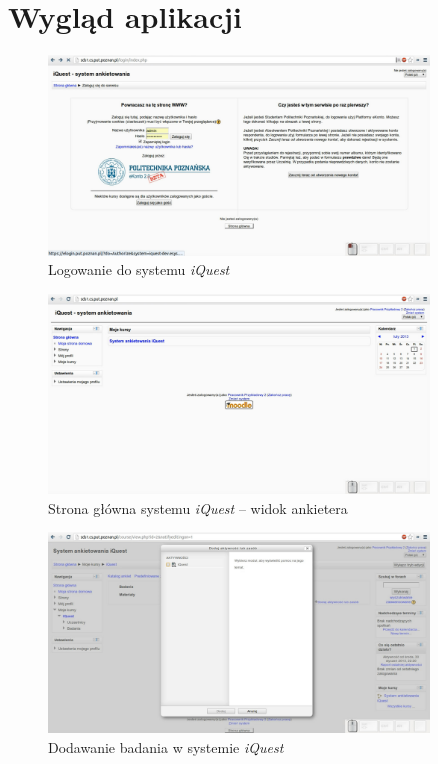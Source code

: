\chapter{Wygląd aplikacji}
\label{Chapterb1}

\begin{figure}[H]
\centering\includegraphics[width=0.9\textwidth]{figures/kb/W2-logowanie}
\caption{Logowanie do systemu \textit{iQuest}}\label{rys:Logowanie}
\end{figure}

\begin{figure}[H]
\centering\includegraphics[width=0.9\textwidth]{figures/kb/W2-stronaglowna}
\caption{Strona główna systemu \textit{iQuest} -- widok ankietera}\label{rys:StronaGlowna}
\end{figure}

\begin{figure}[H]
\centering\includegraphics[width=0.9\textwidth]{figures/kb/W2-dodawaniebadania}
\caption{Dodawanie badania w systemie \textit{iQuest}}\label{rys:DodawanieBadania}
\end{figure}

